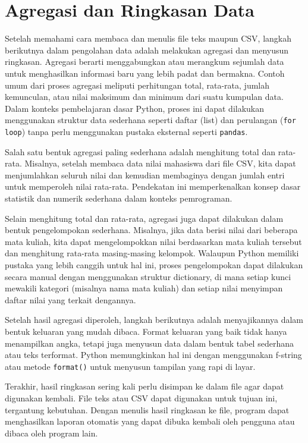 \section{Agregasi dan Ringkasan Data}

Setelah memahami cara membaca dan menulis file teks maupun CSV, langkah berikutnya dalam pengolahan data adalah melakukan agregasi dan menyusun ringkasan. Agregasi berarti menggabungkan atau merangkum sejumlah data untuk menghasilkan informasi baru yang lebih padat dan bermakna. Contoh umum dari proses agregasi meliputi perhitungan total, rata-rata, jumlah kemunculan, atau nilai maksimum dan minimum dari suatu kumpulan data. Dalam konteks pembelajaran dasar Python, proses ini dapat dilakukan menggunakan struktur data sederhana seperti daftar (list) dan perulangan (\texttt{for loop}) tanpa perlu menggunakan pustaka eksternal seperti \texttt{pandas}.

Salah satu bentuk agregasi paling sederhana adalah menghitung total dan rata-rata. Misalnya, setelah membaca data nilai mahasiswa dari file CSV, kita dapat menjumlahkan seluruh nilai dan kemudian membaginya dengan jumlah entri untuk memperoleh nilai rata-rata. Pendekatan ini memperkenalkan konsep dasar statistik dan numerik sederhana dalam konteks pemrograman.

Selain menghitung total dan rata-rata, agregasi juga dapat dilakukan dalam bentuk pengelompokan sederhana. Misalnya, jika data berisi nilai dari beberapa mata kuliah, kita dapat mengelompokkan nilai berdasarkan mata kuliah tersebut dan menghitung rata-rata masing-masing kelompok. Walaupun Python memiliki pustaka yang lebih canggih untuk hal ini, proses pengelompokan dapat dilakukan secara manual dengan menggunakan struktur dictionary, di mana setiap kunci mewakili kategori (misalnya nama mata kuliah) dan setiap nilai menyimpan daftar nilai yang terkait dengannya.

Setelah hasil agregasi diperoleh, langkah berikutnya adalah menyajikannya dalam bentuk keluaran yang mudah dibaca. Format keluaran yang baik tidak hanya menampilkan angka, tetapi juga menyusun data dalam bentuk tabel sederhana atau teks terformat. Python memungkinkan hal ini dengan menggunakan f-string atau metode \texttt{format()} untuk menyusun tampilan yang rapi di layar.

Terakhir, hasil ringkasan sering kali perlu disimpan ke dalam file agar dapat digunakan kembali. File teks atau CSV dapat digunakan untuk tujuan ini, tergantung kebutuhan. Dengan menulis hasil ringkasan ke file, program dapat menghasilkan laporan otomatis yang dapat dibuka kembali oleh pengguna atau dibaca oleh program lain.\\

